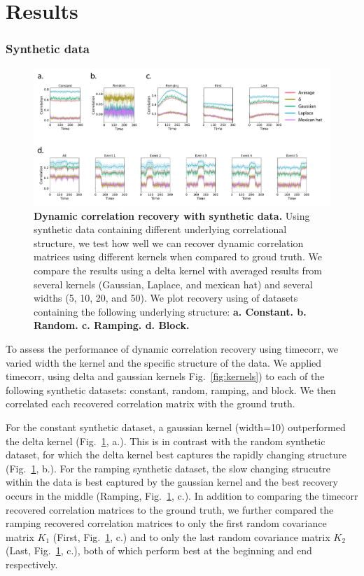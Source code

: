 \documentclass[english]{article}
\begin{document}
\section*{Results}
\subsubsection*{Synthetic data}


\begin{figure}
  \centering
  \includegraphics[width=\textwidth]{figs/synthetic_data.pdf}
  \caption{\textbf{Dynamic correlation recovery with synthetic data. } Using synthetic data containing different
    underlying correlational structure,
   we test how well we can recover dynamic correlation matrices using
   different kernels when compared to groud truth.  We compare the results using a delta kernel
   with averaged results from several kernels (Gaussian, Laplace, and
   mexican hat) and several widths (5, 10, 20, and 50).  We plot recovery using of datasets containing the
    following underlying structure:
    \textbf{a. Constant. b. Random. c. Ramping.  d. Block.}}
  \label{fig:synthetic_data}
\end{figure}

To assess the performance of dynamic correlation recovery using
timecorr, we varied width the kernel and the specific structure of the
data. We applied timecorr, using delta and gaussian kernels
Fig.~\ref{fig:kernels}) to each of the following  
synthetic datasets: constant, random, ramping, and block.  We then correlated each recovered
correlation matrix with the ground truth. 

For the constant synthetic dataset, a gaussian kernel (width=10)
outperformed the delta kernel (Fig.~\ref{fig:synthetic_data},  a.).  This is in contrast with the random
synthetic dataset, for which the delta kernel best captures the
rapidly changing structure (Fig.~\ref{fig:synthetic_data},  b.). For
the ramping synthetic dataset, the slow changing strucutre within the
data is best
captured by the gaussian kernel and the best recovery occurs in the
middle (Ramping, Fig.~\ref{fig:synthetic_data},
c.). In addition to comparing the timecorr recovered correlation
matrices to the ground truth, we
further compared the ramping recovered correlation matrices to only the first random covariance matrix $K_{1}$
(First, Fig.~\ref{fig:synthetic_data},  c.) and to only the last
random covariance matrix $K_{2}$ (Last, Fig.~\ref{fig:synthetic_data},
c.), both of which perform best at the beginning and end respectively.
\end{document}
